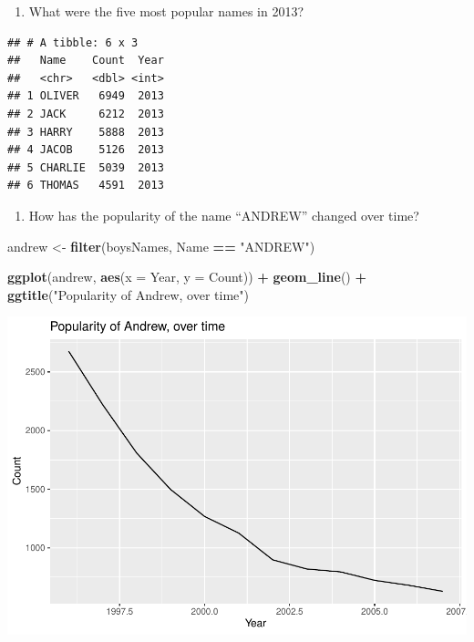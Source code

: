 \documentclass[]{book}
\newenvironment{Shaded}{\begin{snugshade}}{\end{snugshade}}
\newcommand{\DataTypeTok}[1]{\textcolor[rgb]{0.13,0.29,0.53}{#1}}
\newcommand{\DecValTok}[1]{\textcolor[rgb]{0.00,0.00,0.81}{#1}}
\newcommand{\KeywordTok}[1]{\textcolor[rgb]{0.13,0.29,0.53}{\textbf{#1}}}
\newcommand{\NormalTok}[1]{#1}
\newcommand{\OperatorTok}[1]{\textcolor[rgb]{0.81,0.36,0.00}{\textbf{#1}}}
\newcommand{\StringTok}[1]{\textcolor[rgb]{0.31,0.60,0.02}{#1}}
\providecommand{\tightlist}{%
  \setlength{\itemsep}{0pt}\setlength{\parskip}{0pt}}
\begin{document}
\begin{enumerate}
\def\labelenumi{\arabic{enumi}.}
\setcounter{enumi}{2}
\tightlist
\item
  What were the five most popular names in 2013?
\end{enumerate}

\begin{Shaded}
\end{Shaded}

\begin{verbatim}
## # A tibble: 6 x 3
##   Name    Count  Year
##   <chr>   <dbl> <int>
## 1 OLIVER   6949  2013
## 2 JACK     6212  2013
## 3 HARRY    5888  2013
## 4 JACOB    5126  2013
## 5 CHARLIE  5039  2013
## 6 THOMAS   4591  2013
\end{verbatim}

\begin{enumerate}
\def\labelenumi{\arabic{enumi}.}
\setcounter{enumi}{3}
\tightlist
\item
  How has the popularity of the name ``ANDREW'' changed over time?
\end{enumerate}

\begin{Shaded}
\begin{Highlighting}[]
\NormalTok{andrew <-}\StringTok{ }\KeywordTok{filter}\NormalTok{(boysNames, Name }\OperatorTok{==}\StringTok{ "ANDREW"}\NormalTok{)}

\KeywordTok{ggplot}\NormalTok{(andrew, }\KeywordTok{aes}\NormalTok{(}\DataTypeTok{x =}\NormalTok{ Year, }\DataTypeTok{y =}\NormalTok{ Count)) }\OperatorTok{+}
\StringTok{    }\KeywordTok{geom_line}\NormalTok{() }\OperatorTok{+}
\StringTok{    }\KeywordTok{ggtitle}\NormalTok{(}\StringTok{"Popularity of Andrew, over time"}\NormalTok{)}
\end{Highlighting}
\end{Shaded}

\includegraphics{R/RDataWrangling/figures/unnamed-chunk-260-1.pdf}
\end{document}
